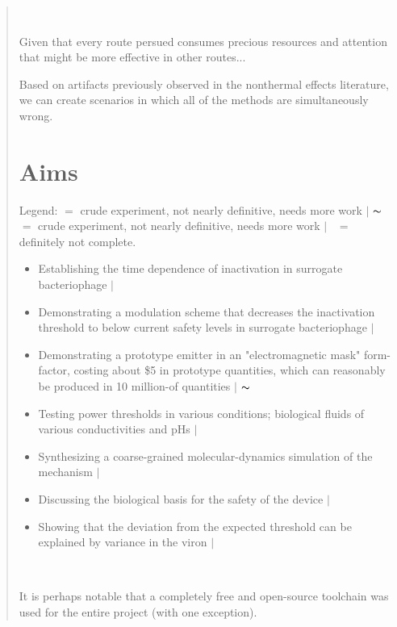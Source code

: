 \documentclass[paper.tex]{subfiles}
\begin{document}
\begin{quotation}\



Given that every route persued consumes precious resources and attention that might be more effective in 
other routes...



Based on artifacts previously observed in the nonthermal effects literature, we can create scenarios in which all of the methods are simultaneously wrong. 

\section{Aims}





Legend:  \cmark $ = $ crude experiment, not nearly definitive, needs more work $\vert$ $\thicksim$ $ = $ crude experiment, not nearly definitive, needs more work $\vert$ \xmark \ $ = $ definitely not complete.\\

\begin{itemize}
  \item Establishing the time dependence of inactivation in surrogate bacteriophage $\vert$ \cmark
  \item Demonstrating a modulation scheme that decreases the inactivation threshold to below current safety levels in surrogate bacteriophage $\vert$ \cmark
  \item Demonstrating a prototype emitter in an "electromagnetic mask" form-factor, costing about \$5 in prototype quantities, which can reasonably be produced in 10 million-of quantities $\vert$ $\thicksim$
  \item Testing power thresholds in various conditions; biological fluids of various conductivities and pHs $\vert$ \xmark
  \item Synthesizing a coarse-grained molecular-dynamics simulation of the mechanism $\vert$ \xmark
  \item Discussing the biological basis for the safety of the device $\vert$ \cmark
  \item Showing that the deviation from the expected threshold can be explained by variance in the viron $\vert$ \cmark
  
\end{itemize}\


\tableofcontents


It is perhaps notable that a completely free and open-source toolchain was used for the entire project (with one exception).

\end{quotation}
\end{document}
